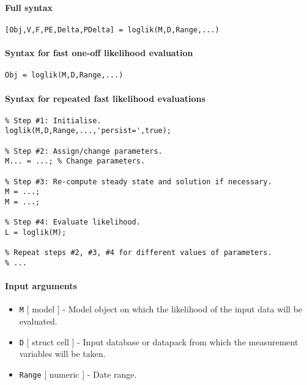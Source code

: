 


	\paragraph{Full syntax}

\begin{verbatim}
[Obj,V,F,PE,Delta,PDelta] = loglik(M,D,Range,...)
\end{verbatim}

\paragraph{Syntax for fast one-off likelihood
evaluation}

\begin{verbatim}
Obj = loglik(M,D,Range,...)
\end{verbatim}

\paragraph{Syntax for repeated fast likelihood
evaluations}

\begin{verbatim}
% Step #1: Initialise.
loglik(M,D,Range,...,'persist=',true);

% Step #2: Assign/change parameters.
M... = ...; % Change parameters.

% Step #3: Re-compute steady state and solution if necessary.
M = ...;
M = ...;

% Step #4: Evaluate likelihood.
L = loglik(M);

% Repeat steps #2, #3, #4 for different values of parameters.
% ...
\end{verbatim}

\paragraph{Input arguments}

\begin{itemize}
\item
  \texttt{M} {[} model {]} - Model object on which the likelihood of the
  input data will be evaluated.
\item
  \texttt{D} {[} struct \textbar{} cell {]} - Input database or datapack
  from which the measurement variables will be taken.
\item
  \texttt{Range} {[} numeric {]} - Date range.
\end{itemize}

